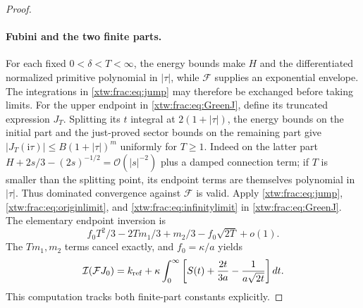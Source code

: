 \documentclass[11pt]{article}
\theoremstyle{remark}\newtheorem{remark}[theorem]{Remark}
\newcommand{\OO}{\mathcal O}
\newcommand{\ii}{\mathrm i}
\newcommand{\FF}{\mathcal F}
\newcommand{\inv}{\mathcal I}
\begin{document}
\begin{proof}
\paragraph{Fubini and the two finite parts.}
For each fixed $0<\delta<T<\infty$, the energy bounds make $H$ and the
differentiated normalized primitive polynomial in $|\tau|$, while $\FF$
supplies an exponential envelope. The integrations in
\eqref{xtw:frac:eq:jump} may therefore be exchanged before taking limits.
For the upper endpoint in \eqref{xtw:frac:eq:GreenJ}, define its truncated expression
$J_T$. Splitting its $t$ integral at $2(1+|\tau|)$, the energy bounds on
the initial part and the just-proved sector bounds on the remaining part
give $|J_T(\ii\tau)|\le B(1+|\tau|)^m$ uniformly for $T\ge1$.
Indeed on the latter part
$H+2s/3-(2s)^{-1/2}=\OO(|s|^{-2})$ plus a damped connection term;
if $T$ is smaller than the splitting point, its endpoint terms are themselves
polynomial in $|\tau|$. Thus dominated convergence against $\FF$ is valid.
Apply \eqref{xtw:frac:eq:jump}, \eqref{xtw:frac:eq:originlimit}, and
\eqref{xtw:frac:eq:infinitylimit} in \eqref{xtw:frac:eq:GreenJ}. The elementary endpoint
inversion is
\[
 f_0T^2/3-2Tm_1/3+m_2/3-f_0\sqrt{2T}+o(1).
\]
The $Tm_1,m_2$ terms cancel exactly, and $f_0=\kappa/a$ yields
\begin{equation}\label{xtw:frac:eq:invertedJ}
 \inv(\FF J_0)=k_{\rm ref}
 +\kappa\int_0^\infty\left[S(t)+\frac{2t}{3a}
                                  -\frac1{a\sqrt{2t}}\right]dt.
\end{equation}
This computation tracks both finite-part constants explicitly.


\end{proof}
\end{document}
